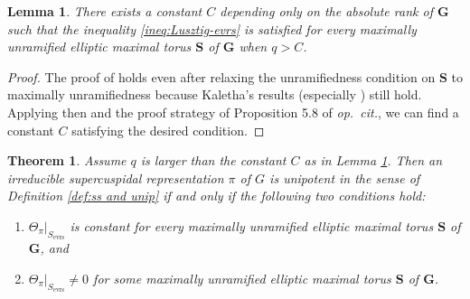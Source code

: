\documentclass{amsart}
\newcommand{\evrs}{\mathrm{evrs}}
\newcommand{\bfG}{\mathbf{G}}
\newcommand{\bfS}{\mathbf{S}}
\theoremstyle{plain}
\newtheorem{theorem}[thm]{Theorem}
\newtheorem{lemma}[thm]{Lemma}
\theoremstyle{definition}
\theoremstyle{remark}
\theoremstyle{theorem}
\begin{document}
\begin{lemma}\label{lem:strong Henniart sat max unram}
    There exists a constant $C$ depending only on the absolute rank of $\bfG$ such that the inequality \eqref{ineq:Lusztig-evrs} is satisfied for every maximally unramified elliptic maximal torus $\bfS$ of $\bfG$ when $q > C$.
\end{lemma}

\begin{proof}
    The proof of \cite[Lemma 5.6]{CO21} holds even after relaxing the unramifiedness condition on $\bfS$ to maximally unramifiedness because Kaletha's results (especially \cite[Lemma 3.4.12 (1)]{Kal19}) still hold. Applying then \cite[Lemma 5.7]{CO21} and the proof strategy of Proposition 5.8 of \textit{op.\ cit.}, we can find a constant $C$ satisfying the desired condition.
\end{proof}

\begin{theorem}\label{thm:p-adic unipotent}
    Assume $q$ is larger than the constant $C$ as in Lemma \ref{lem:strong Henniart sat max unram}. Then an irreducible supercuspidal representation $\pi$ of $G$ is unipotent in the sense of Definition \ref{def:ss and unip} if and only if the following two conditions hold:
    \begin{enumerate}[label=(\roman*)]
        \item $\Theta_\pi|_{S_{\evrs}}$ is constant for every maximally unramified elliptic maximal torus $\bfS$ of $\bfG$, and
        \item $\Theta_\pi|_{S_{\evrs}} \neq 0$ for some maximally unramified elliptic maximal torus $\bfS$ of $\bfG$.
    \end{enumerate}
\end{theorem}
\end{document}
